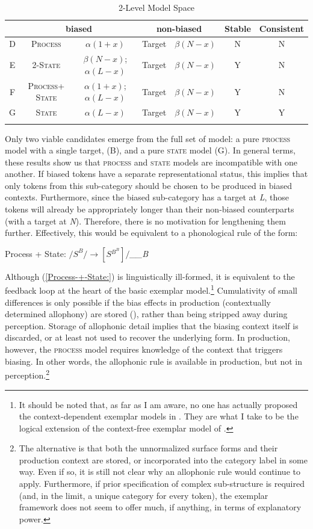 \begin{table}[h]\footnotesize
\caption{2-Level Model Space\label{tab: Model Comparison}}
\begin{tabular}{ccccccc}
\lsptoprule
 & \multicolumn{2}{c}{biased} & \multicolumn{2}{c}{non-biased} & Stable & Consistent\tabularnewline\midrule
D & \textsc{Process} & $\alpha(1+x)$ & Target & $\beta(N-x)$ & N & N\tabularnewline
E & \textsc{2-State} & $\beta(N-x)$; $\alpha(L-x)$ & Target & $\beta(N-x)$ & Y & N\tabularnewline
F & \textsc{Process+ State} & $\alpha(1+x)$; $\alpha(L-x)$ & Target & $\beta(N-x)$ & Y & N\tabularnewline
G & \textsc{State} & $\alpha(L-x)$ & Target & $\beta(N-x)$ & Y & Y\tabularnewline
\lspbottomrule
\end{tabular}
\end{table}

Only two viable candidates emerge from the full set of model: a pure
\textsc{process} model with a single target, (B), and a pure \textsc{state}
model (G). In general terms, these results show us that \textsc{process}
and \textsc{state} models are incompatible with one another. If biased
tokens have a separate representational status, this implies that
only tokens from this sub-category should be chosen to be produced
in biased contexts. Furthermore, since the biased sub-category has
a target at \emph{L}, those tokens will already be appropriately longer
than their non-biased counterparts (with a target at \emph{N}). Therefore,
there is no motivation for lengthening them further. Effectively,
this would be equivalent to a phonological rule of the form:
\begin{covexamples}
\item \label{Process-+-State:}Process + State: $/S^{B}/\rightarrow[S{}^{B^{B}}]/$\emph{\_\_B}
\end{covexamples}
Although (\ref{Process-+-State:}) is linguistically ill-formed, it
is equivalent to the feedback loop at the heart of the basic exemplar
model.\footnote{It should be noted that, as far as I am aware, no one has actually
proposed the context-dependent exemplar models in .
They are what I take to be the logical extension of the context-free
exemplar model of \citet{Pierrehumbert2000}.} Cumulativity of small differences is only possible if the bias effects
in production (contextually determined allophony) are stored (),
rather than being stripped away during perception. Storage of allophonic
detail implies that the biasing context itself is discarded, or at
least not used to recover the underlying form. In production, however,
the \textsc{process} model requires knowledge of the context that
triggers biasing. In other words, the allophonic rule is available
in production, but not in perception.\footnote{The alternative is that both the unnormalized surface forms and their
production context are stored, or incorporated into the category label
in some way. Even if so, it is still not clear why an allophonic rule
would continue to apply. Furthermore, if prior specification of complex
sub-structure is required (and, in the limit, a unique category for
every token), the exemplar framework does not seem to offer much, if
anything, in terms of explanatory power. }

